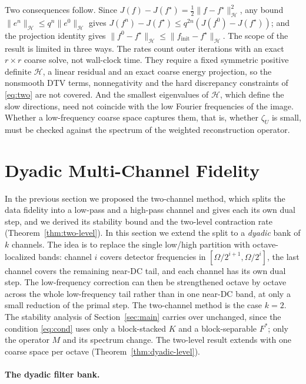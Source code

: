 \documentclass{article}
\begin{document}
Two consequences follow. Since $J(f)-J(f^\star)=\tfrac12\|f-f^\star\|_{\mathcal H}^2$, any bound $\|e^n\|_{\mathcal H}\le q^n\|e^0\|_{\mathcal H}$ gives $J(f^n)-J(f^\star)\le q^{2n}(J(f^0)-J(f^\star))$; and the projection identity gives $\|f^0-f^\star\|_{\mathcal H}\le\|f_{\mathrm{init}}-f^\star\|_{\mathcal H}$. The scope of the result is limited in three ways. The rates count outer iterations with an exact $r\times r$ coarse solve, not wall-clock time. They require a fixed symmetric positive definite $\mathcal H$, a linear residual and an exact coarse energy projection, so the nonsmooth DTV terms, nonnegativity and the hard discrepancy constraints of \eqref{eq:two} are not covered. And the smallest eigenvalues of $\mathcal H$, which define the slow directions, need not coincide with the low Fourier frequencies of the image. Whether a low-frequency coarse space captures them, that is, whether $\zeta_U$ is small, must be checked against the spectrum of the weighted reconstruction operator.

\section{Dyadic Multi-Channel Fidelity}
\label{sec:dyadic}

In the previous section we proposed the two-channel method, which splits the data fidelity into a low-pass and a high-pass channel and gives each its own dual step, and we derived its stability bound and the two-level contraction rate (Theorem~\ref{thm:two-level}). In this section we extend the split to a \emph{dyadic} bank of $k$ channels. The idea is to replace the single low/high partition with octave-localized bands: channel $i$ covers detector frequencies in $[\Omega/2^{i+1},\Omega/2^{i}]$, the last channel covers the remaining near-DC tail, and each channel has its own dual step. The low-frequency correction can then be strengthened octave by octave across the whole low-frequency tail rather than in one near-DC band, at only a small reduction of the primal step. The two-channel method is the case $k=2$. The stability analysis of Section~\ref{sec:main} carries over unchanged, since the condition \eqref{eq:cond} uses only a block-stacked $K$ and a block-separable $F^\ast$; only the operator $M$ and its spectrum change. The two-level result extends with one coarse space per octave (Theorem~\ref{thm:dyadic-level}).

\paragraph{The dyadic filter bank.}
\end{document}
